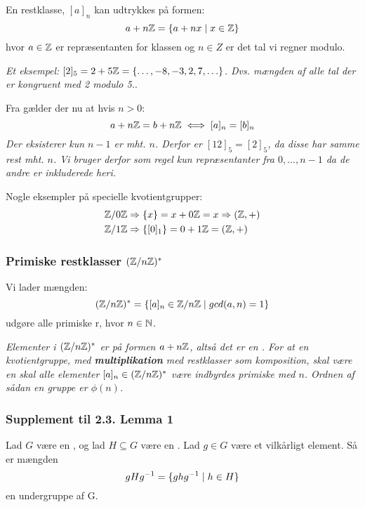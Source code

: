 En restklasse, $[a]_n$ kan udtrykkes på formen:
\begin{equation*}
  a + n\mathbb{Z} = \{a + nx \mid x \in \mathbb{Z}\}
\end{equation*}
hvor $a \in \mathbb{Z}$ er repræsentanten for klassen og $n \in Z$ er det tal vi regner
modulo.

\textit{Et eksempel: $[2]_5 = 2 + 5\mathbb{Z} = \{\ldots, -8, -3, 2, 7, \ldots\}$. Dvs.
mængden af alle tal der er kongruent med 2 modulo 5.}.

Fra  gælder der nu at hvis $n > 0$:
\begin{equation*}
  a + n\mathbb{Z} = b + n\mathbb{Z} \iff [a]_n = [b]_n
\end{equation*}
\textit{Der eksisterer kun $n-1$ er mht. $n$. Derfor er
$[12]_5 = [2]_5$, da disse har samme rest mht. $n$. Vi bruger derfor som regel
kun repræsentanter fra $0,\ldots,n-1$ da de andre er inkluderede heri.}

Nogle eksempler på specielle kvotientgrupper:
\begin{align*}
  &\mathbb{Z}/0\mathbb{Z} \Rightarrow \{ x \} = x + 0\mathbb{Z} = x  \Rightarrow (\mathbb{Z}, +)\\
  &\mathbb{Z}/1\mathbb{Z} \Rightarrow \{ [0]_1 \} = 0 + 1\mathbb{Z} = (\mathbb{Z}, +)
\end{align*}

\subsubsection{Primiske restklasser $(\mathbb{Z}/n\mathbb{Z})^*$}
\label{Primiske restklasser}
Vi lader mængden:
\begin{equation*}
  (\mathbb{Z}/n\mathbb{Z})^* = \{ [a]_n \in \mathbb{Z}/n\mathbb{Z} \mid gcd(a,n) = 1 \}
\end{equation*}
udgøre alle primiske r, hvor $n \in \mathbb{N}$.

\textit{Elementer i $(\mathbb{Z}/n\mathbb{Z})^*$ er på formen $a + n\mathbb{Z}$, altså det er en
. For at en kvotientgruppe, med \textbf{multiplikation}
med restklasser som komposition, skal være en  skal alle
elementer $[a]_n \in (\mathbb{Z}/n\mathbb{Z})^*$ være indbyrdes primiske med $n$. Ordnen af
sådan en gruppe er $\phi(n)$.}

\subsubsection{Supplement til 2.3. Lemma 1}
Lad $G$ være en , og lad $H \subseteq G$ være en
. Lad $g \in G$ være et vilkårligt element. Så er mængden
\begin{equation*}
  gHg^{-1} = \{ ghg^{-1} \mid h \in H \}
\end{equation*} 
en undergruppe af G.

